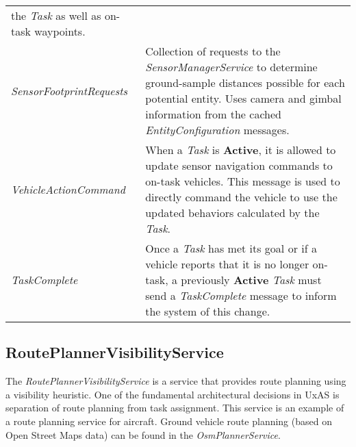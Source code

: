 \begin{longtable}[c]{@{}ll@{}}
\begin{minipage}[t]{0.65\columnwidth}
the \emph{Task} as well as on-task waypoints.
\strut\end{minipage}\tabularnewline
\begin{minipage}[t]{0.29\columnwidth}\raggedright\strut
\emph{SensorFootprintRequests}
\strut\end{minipage} &
\begin{minipage}[t]{0.65\columnwidth}\raggedright\strut
Collection of requests to the \emph{SensorManagerService} to determine
ground-sample distances possible for each potential entity. Uses camera
and gimbal information from the cached \emph{EntityConfiguration}
messages.
\strut\end{minipage}\tabularnewline
\begin{minipage}[t]{0.29\columnwidth}\raggedright\strut
\emph{VehicleActionCommand}
\strut\end{minipage} &
\begin{minipage}[t]{0.65\columnwidth}\raggedright\strut
When a \emph{Task} is \textbf{Active}, it is allowed to update sensor
navigation commands to on-task vehicles. This message is used to
directly command the vehicle to use the updated behaviors calculated by
the \emph{Task}.
\strut\end{minipage}\tabularnewline
\begin{minipage}[t]{0.29\columnwidth}\raggedright\strut
\emph{TaskComplete}
\strut\end{minipage} &
\begin{minipage}[t]{0.65\columnwidth}\raggedright\strut
Once a \emph{Task} has met its goal or if a vehicle reports that it is
no longer on-task, a previously \textbf{Active} \emph{Task} must send a
\emph{TaskComplete} message to inform the system of this change.
\strut\end{minipage}\tabularnewline
\bottomrule
\end{longtable}

\subsection{RoutePlannerVisibilityService}\label{routeplannervisibilityservice}

The \emph{RoutePlannerVisibilityService} is a service that provides
route planning using a visibility heuristic. One of the fundamental
architectural decisions in UxAS is separation of route planning from
task assignment. This service is an example of a route planning service
for aircraft. Ground vehicle route planning (based on Open Street Maps
data) can be found in the \emph{OsmPlannerService}.

